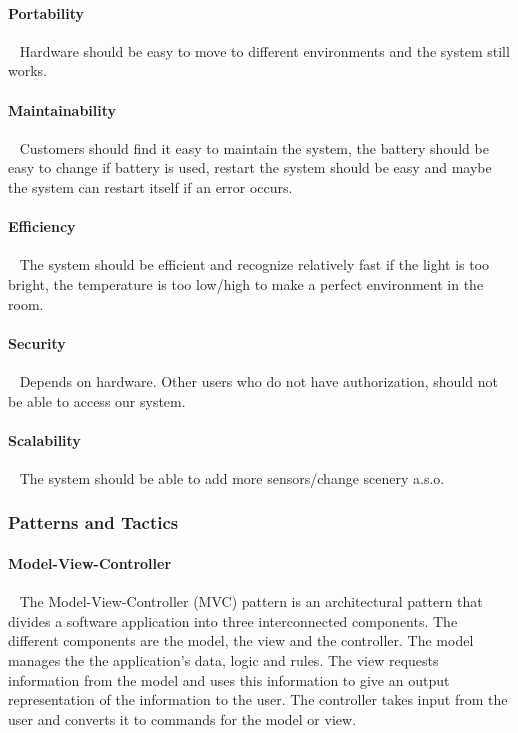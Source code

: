 \documentclass[../document]{subfiles}
\begin{document}
\paragraph{Portability} \ \newline
Hardware should be easy to move to different environments and the system still works.

\paragraph{Maintainability} \ \newline
Customers should find it easy to maintain the system, the battery should be easy to change if battery is used, restart the system should be easy and maybe the system can restart itself if an error occurs. 

\paragraph{Efficiency} \ \newline
The system should be efficient and recognize relatively fast if the light is too bright, the temperature is too low/high to make a perfect environment in the room. 

\paragraph{Security} \ \newline
Depends on hardware. Other users who do not have authorization, should not be able to access our system.

\paragraph{Scalability} \ \newline
The system should be able to add more sensors/change scenery a.s.o.  

\subsubsection{Patterns and Tactics}
\paragraph{Model-View-Controller}  \ \newline
The Model-View-Controller (MVC) pattern is an architectural pattern that divides a software application into three interconnected components. The different components are the model, the view and the controller. The model manages the the application’s data, logic and rules. The view requests information from the model and uses this information to give an output representation of the information to the user. The controller takes input from the user and converts it to commands for the model or view. 
\end{document}
